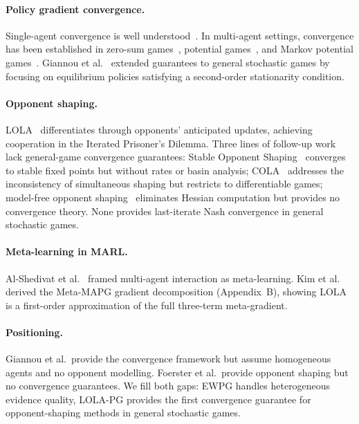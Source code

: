 \documentclass[a4paper,oneside,11pt]{report}
\begin{document}
\paragraph{Policy gradient convergence.} Single-agent convergence is well understood~\cite{agarwal2021theory,mei2020global}. In multi-agent settings, convergence has been established in zero-sum games~\cite{daskalakis2018training}, potential games~\cite{leonardos2022global}, and Markov potential games~\cite{cen2021fast}. Giannou et al.~\cite{giannou2022} extended guarantees to general stochastic games by focusing on equilibrium policies satisfying a second-order stationarity condition.

\paragraph{Opponent shaping.} LOLA~\cite{foerster2018lola} differentiates through opponents' anticipated updates, achieving cooperation in the Iterated Prisoner's Dilemma. Three lines of follow-up work lack general-game convergence guarantees: Stable Opponent Shaping~\cite{letcher2019} converges to stable fixed points but without rates or basin analysis; COLA~\cite{willi2022cola} addresses the inconsistency of simultaneous shaping but restricts to differentiable games; model-free opponent shaping~\cite{lu2022model} eliminates Hessian computation but provides no convergence theory. None provides last-iterate Nash convergence in general stochastic games.

\paragraph{Meta-learning in MARL.} Al-Shedivat et al.~\cite{alshedivat2018} framed multi-agent interaction as meta-learning. Kim et al.~\cite{kim2021policygradientalgorithmlearning} derived the Meta-MAPG gradient decomposition (Appendix~B), showing LOLA is a first-order approximation of the full three-term meta-gradient.

\paragraph{Positioning.} Giannou et al.\ provide the convergence framework but assume homogeneous agents and no opponent modelling. Foerster et al.\ provide opponent shaping but no convergence guarantees. We fill both gaps: EWPG handles heterogeneous evidence quality, LOLA-PG provides the first convergence guarantee for opponent-shaping methods in general stochastic games.
\end{document}

